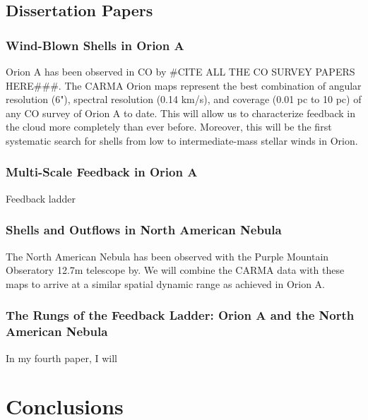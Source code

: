     
    
    \subsection{Dissertation Papers}\label{sec:papers}
        \subsubsection{Wind-Blown Shells in Orion A}\label{sec:paper1}
        Orion A has been observed in CO by #CITE ALL THE CO SURVEY PAPERS HERE###. The CARMA Orion maps represent the best combination of angular resolution (6"), spectral resolution (0.14 km/s), and coverage (0.01 pc to 10 pc) of any CO survey of Orion A to date. This will allow us to characterize feedback in the cloud more completely than ever before. Moreover, this will be the first systematic search for shells from low to intermediate-mass stellar winds in Orion. 
        
        \subsubsection{Multi-Scale Feedback in Orion A}\label{sec:paper2}
        Feedback ladder
        \subsubsection{Shells and Outflows in North American Nebula}\label{sec:paper3}
        The North American Nebula has been observed with the Purple Mountain Obseratory 12.7m telescope by. We will combine the CARMA data with these maps to arrive at a similar spatial dynamic range as achieved in Orion A.
        \subsubsection{The Rungs of the Feedback Ladder: Orion A and the North American Nebula}\label{sec:paper4}
        In my fourth paper, I will 
\section{Conclusions}\label{sec:conclusions}
    
    


  
  